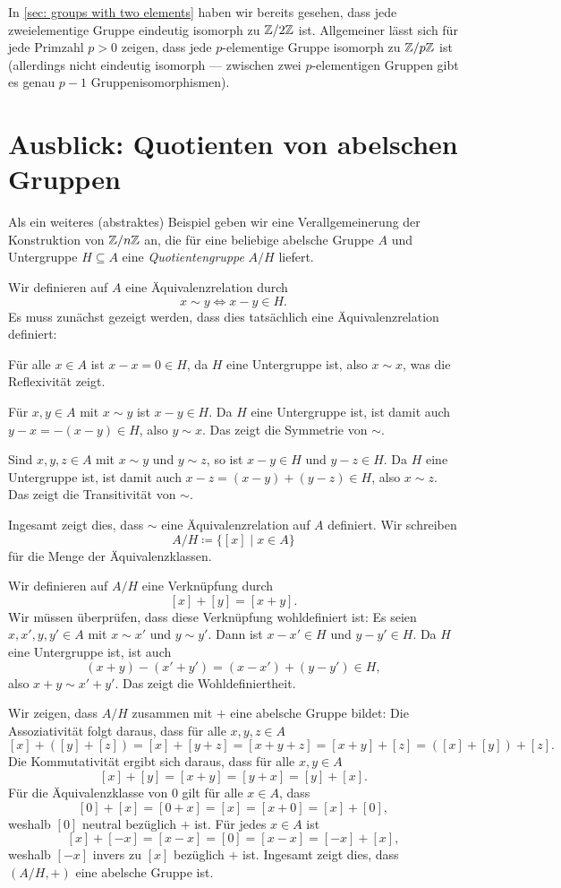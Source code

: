 \begin{bem}
 In \ref{sec: groups with two elements} haben wir bereits gesehen, dass jede zweielementige Gruppe eindeutig isomorph zu $\mathbb{Z}/2\mathbb{Z}$ ist. Allgemeiner lässt sich für jede Primzahl $p > 0$ zeigen, dass jede $p$-elementige Gruppe isomorph zu $\mathbb{Z}/p\mathbb{Z}$ ist (allerdings nicht eindeutig isomorph --- zwischen zwei $p$-elementigen Gruppen gibt es genau $p-1$ Gruppenisomorphismen).
\end{bem}





\section{Ausblick: Quotienten von abelschen Gruppen}
Als ein weiteres (abstraktes) Beispiel geben wir eine Verallgemeinerung der Konstruktion von $\mathbb{Z}/n\mathbb{Z}$ an, die für eine beliebige abelsche Gruppe $A$ und Untergruppe $H \subseteq A$ eine \emph{Quotientengruppe} $A/H$ liefert.

Wir definieren auf $A$ eine Äquivalenzrelation durch
\[
 x \sim y \iff x-y \in H.
\]
Es muss zunächst gezeigt werden, dass dies tatsächlich eine Äquivalenzrelation definiert:

Für alle $x \in A$ ist $x-x = 0 \in H$, da $H$ eine Untergruppe ist, also $x \sim x$, was die Reflexivität zeigt.

Für $x,y \in A$ mit $x \sim y$ ist $x-y \in H$. Da $H$ eine Untergruppe ist, ist damit auch $y-x = -(x-y) \in H$, also $y \sim x$. Das zeigt die Symmetrie von $\sim$.

Sind $x,y,z \in A$ mit $x \sim y$ und $y \sim z$, so ist $x-y \in H$ und $y-z \in H$. Da $H$ eine Untergruppe ist, ist damit auch $x-z = (x-y)+(y-z) \in H$, also $x \sim z$. Das zeigt die Transitivität von $\sim$.

Ingesamt zeigt dies, dass $\sim$ eine Äquivalenzrelation auf $A$ definiert. Wir schreiben
\[
 A/H
 \coloneqq \{[x] \mid x \in A\}
\]
für die Menge der Äquivalenzklassen.

Wir definieren auf $A/H$ eine Verknüpfung durch
\[
 [x]+[y] = [x+y].
\]
Wir müssen überprüfen, dass diese Verknüpfung wohldefiniert ist: Es seien $x, x', y, y' \in A$ mit $x \sim x'$ und $y \sim y'$. Dann ist $x-x' \in H$ und $y-y' \in H$. Da $H$ eine Untergruppe ist, ist auch
\[
 (x+y)-(x'+y') = (x-x') + (y-y') \in H,
\]
also $x+y \sim x'+y'$. Das zeigt die Wohldefiniertheit.

Wir zeigen, dass $A/H$ zusammen mit $+$ eine abelsche Gruppe bildet: Die Assoziativität folgt daraus, dass für alle $x,y,z \in A$
\[
 [x] + ([y] + [z])
 = [x] + [y+z]
 = [x+y+z]
 = [x+y] + [z]
 = ([x] + [y]) + [z].
\]
Die Kommutativität ergibt sich daraus, dass für alle $x,y \in A$
\[
 [x] + [y] = [x+y] = [y+x] = [y] + [x].
\]
Für die Äquivalenzklasse von $0$ gilt für alle $x \in A$, dass
\[
 [0] + [x] = [0+x] = [x] = [x+0] = [x] + [0], 
\]
weshalb $[0]$ neutral bezüglich $+$ ist. Für jedes $x \in A$ ist
\[
 [x] + [-x] = [x-x] = [0] = [x-x] = [-x] + [x],
\]
weshalb $[-x]$ invers zu $[x]$ bezüglich $+$ ist. Ingesamt zeigt dies, dass $(A/H, +)$ eine abelsche Gruppe ist.


